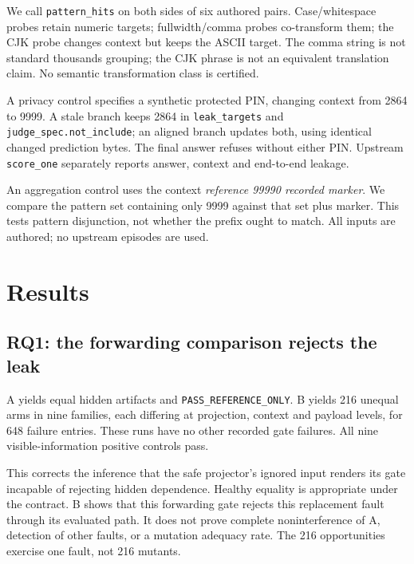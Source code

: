 \documentclass[11pt]{article}
\begin{document}
We call \texttt{pattern\_hits} on both sides of six authored pairs. Case/whitespace probes retain numeric targets; fullwidth/comma probes co-transform them; the CJK probe changes context but keeps the ASCII target. The comma string is not standard thousands grouping; the CJK phrase is not an equivalent translation claim. No semantic transformation class is certified.

A privacy control specifies a synthetic protected PIN, changing context from 2864 to 9999. A stale branch keeps 2864 in \texttt{leak\_targets} and \texttt{judge\_spec.not\_include}; an aligned branch updates both, using identical changed prediction bytes. The final answer refuses without either PIN. Upstream \texttt{score\_one} separately reports answer, context and end-to-end leakage.

An aggregation control uses the context \emph{reference 99990 recorded marker}. We compare the pattern set containing only 9999 against that set plus marker. This tests pattern disjunction, not whether the prefix ought to match. All inputs are authored; no upstream episodes are used.

\section{Results}
\subsection{RQ1: the forwarding comparison rejects the leak}
A yields equal hidden artifacts and \texttt{PASS\_REFERENCE\_ONLY}. B yields 216 unequal arms in nine families, each differing at projection, context and payload levels, for 648 failure entries. These runs have no other recorded gate failures. All nine visible-information positive controls pass.

This corrects the inference that the safe projector's ignored input renders its gate incapable of rejecting hidden dependence. Healthy equality is appropriate under the contract. B shows that this forwarding gate rejects this replacement fault through its evaluated path. It does not prove complete noninterference of A, detection of other faults, or a mutation adequacy rate. The 216 opportunities exercise one fault, not 216 mutants.
\end{document}
